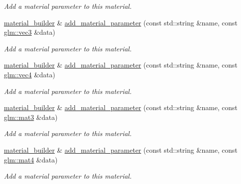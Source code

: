 \begin{DoxyCompactItemize}
\begin{DoxyCompactList}\small\item\em Add a material parameter to this material. \end{DoxyCompactList}\item 
\mbox{\hyperlink{classmoka_1_1material__builder}{material\+\_\+builder}} \& \mbox{\hyperlink{classmoka_1_1material__builder_a11554de3ac69b03e2ae6acb64041b820}{add\+\_\+material\+\_\+parameter}} (const std\+::string \&name, const \mbox{\hyperlink{namespacemoka_aed2224bc0e5b79e57a8975ded94ee1aaa97ade28e93c0de60adc075bdbe07ca36}{glm\+::vec3}} \&data)
\begin{DoxyCompactList}\small\item\em Add a material parameter to this material. \end{DoxyCompactList}\item 
\mbox{\hyperlink{classmoka_1_1material__builder}{material\+\_\+builder}} \& \mbox{\hyperlink{classmoka_1_1material__builder_a072f41a2e6358c376d9effaae7df84e0}{add\+\_\+material\+\_\+parameter}} (const std\+::string \&name, const \mbox{\hyperlink{namespacemoka_aed2224bc0e5b79e57a8975ded94ee1aaa1a9028fd802c481a99491a418ca2fe86}{glm\+::vec4}} \&data)
\begin{DoxyCompactList}\small\item\em Add a material parameter to this material. \end{DoxyCompactList}\item 
\mbox{\hyperlink{classmoka_1_1material__builder}{material\+\_\+builder}} \& \mbox{\hyperlink{classmoka_1_1material__builder_a12f85b4426611e3b929ea19f8957d0f3}{add\+\_\+material\+\_\+parameter}} (const std\+::string \&name, const \mbox{\hyperlink{namespacemoka_aed2224bc0e5b79e57a8975ded94ee1aaa0dd87e9dfdea657e8be233b5836821d0}{glm\+::mat3}} \&data)
\begin{DoxyCompactList}\small\item\em Add a material parameter to this material. \end{DoxyCompactList}\item 
\mbox{\hyperlink{classmoka_1_1material__builder}{material\+\_\+builder}} \& \mbox{\hyperlink{classmoka_1_1material__builder_a0a7d0c5314739e8cfdc4bc12e237e568}{add\+\_\+material\+\_\+parameter}} (const std\+::string \&name, const \mbox{\hyperlink{namespacemoka_aed2224bc0e5b79e57a8975ded94ee1aaabe14b41eb96410ea28b32bc138d885ae}{glm\+::mat4}} \&data)
\begin{DoxyCompactList}\small\item\em Add a material parameter to this material. \end{DoxyCompactList}\item 

\end{DoxyCompactItemize}
